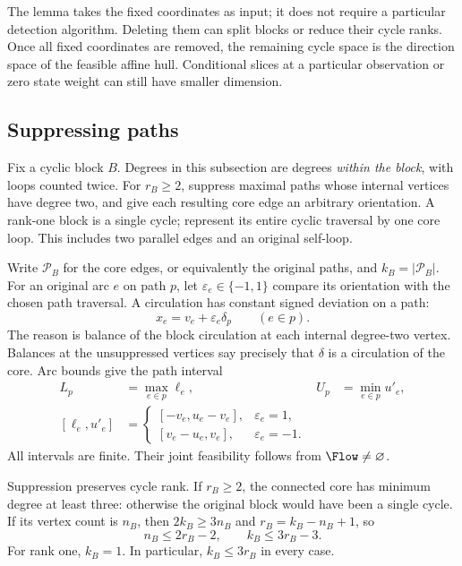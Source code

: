 The lemma takes the fixed coordinates as input; it does not require a
particular detection algorithm. Deleting them can split blocks or reduce
their cycle ranks. Once all fixed coordinates are removed, the remaining
cycle space is the direction space of the feasible affine hull. Conditional
slices at a particular observation or zero state weight can still have
smaller dimension.

\subsection{Suppressing paths}\label{subsec:suppression}
Fix a cyclic block $B$. Degrees in this subsection are degrees \emph{within
the block}, with loops counted twice. For $r_B\ge2$, suppress maximal paths
whose internal vertices have degree two, and give each resulting core edge
an arbitrary orientation. A rank-one block is a single cycle; represent
its entire cyclic traversal by one core loop. This includes two parallel
edges and an original self-loop.

Write $\mathcal P_B$ for the core edges, or equivalently the original
paths, and $k_B=|\mathcal P_B|$. For an original arc $e$ on path $p$, let
$\varepsilon_e\in\{-1,1\}$ compare its orientation with the chosen
path traversal. A circulation has constant signed deviation on a path:
\begin{equation}\label{eq:path-deviation}
 x_e=v_e+\varepsilon_e\delta_p\qquad(e\in p).
\end{equation}
The reason is balance of the block circulation at each internal degree-two
vertex. Balances at the unsuppressed vertices say precisely that $\delta$
is a circulation of the core. Arc bounds give the path interval
\begin{align}
 L_p&=\max_{e\in p}\ell_e,& U_p&=\min_{e\in p}u'_e,\label{eq:path-intervals}\\
 [\ell_e,u'_e]&=
 \begin{cases}[-v_e,u_e-v_e],&\varepsilon_e=1,\\
 [v_e-u_e,v_e],&\varepsilon_e=-1.
 \end{cases}\nonumber
\end{align}
All intervals are finite. Their joint feasibility follows from
$\Flow\ne\varnothing$.

Suppression preserves cycle rank. If $r_B\ge2$, the connected core has
minimum degree at least three: otherwise the original block would have
been a single cycle. If its vertex count is $n_B$, then
$2k_B\ge3n_B$ and $r_B=k_B-n_B+1$, so
\begin{equation}\label{eq:core-size}
 n_B\le2r_B-2,\qquad k_B\le3r_B-3.
\end{equation}
For rank one, $k_B=1$. In particular, $k_B\le3r_B$ in every case.

